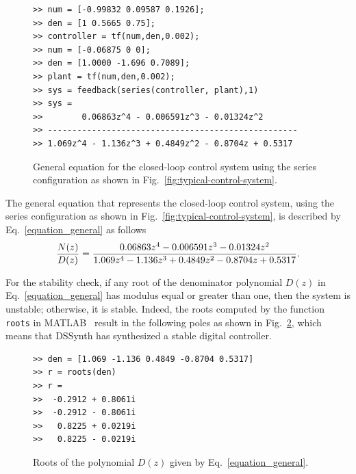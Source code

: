 \documentclass[10pt,conference]{IEEEtran}
\begin{document}
\begin{figure}[ht]
\scriptsize
\begin{lstlisting}[xleftmargin=.025\textwidth,xrightmargin=.025\textwidth, frame=single,]
>> num = [-0.99832 0.09587 0.1926];
>> den = [1 0.5665 0.75];
>> controller = tf(num,den,0.002);
>> num = [-0.06875 0 0];
>> den = [1.0000 -1.696 0.7089];
>> plant = tf(num,den,0.002);
>> sys = feedback(series(controller, plant),1)
>> sys =
>>        0.06863z^4 - 0.006591z^3 - 0.01324z^2
>> ---------------------------------------------------
>> 1.069z^4 - 1.136z^3 + 0.4849z^2 - 0.8704z + 0.5317
\end{lstlisting}
\vspace{-0.2cm}
\caption{General equation for the closed-loop control system using the series configuration as shown in Fig.~\ref{fig:typical-control-system}.}
\label{combine-controller-plant}
\end{figure}

The general equation that represents the closed-loop control system, using the series configuration as shown in Fig.~\ref{fig:typical-control-system},
is described by Eq.~\ref{equation_general} as follows
%
\begin{equation}
\small
\label{equation_general}
\frac{N(z)}{D(z)}=\frac{0.06863z^{4} - 0.006591z^{3} - 0.01324z^{2}}{1.069z^{4} - 1.136z^{3} + 0.4849z^{2} -0.8704z + 0.5317}.
\end{equation}
 
For the stability check, if any root of the denominator polynomial $D(z)$ in Eq.~\ref{equation_general} 
has modulus equal or greater than one, then the system is unstable; 
otherwise, it is stable. Indeed, the roots computed by the function \texttt{roots} 
in MATLAB~\cite{matlab-toolbox} result in the following poles as shown in Fig.~\ref{roots-of-dz}, 
which means that DSSynth has synthesized a stable digital controller.

\begin{figure}[ht]
\scriptsize
\begin{lstlisting}[xleftmargin=.025\textwidth,xrightmargin=.025\textwidth, frame=single,]
>> den = [1.069 -1.136 0.4849 -0.8704 0.5317]
>> r = roots(den)
>> r =
>>  -0.2912 + 0.8061i
>>  -0.2912 - 0.8061i
>>   0.8225 + 0.0219i
>>   0.8225 - 0.0219i
\end{lstlisting}
\vspace{-0.2cm}
\caption{Roots of the polynomial $D(z)$ given by Eq.~\ref{equation_general}.}
\label{roots-of-dz}
\end{figure}
\end{document}

